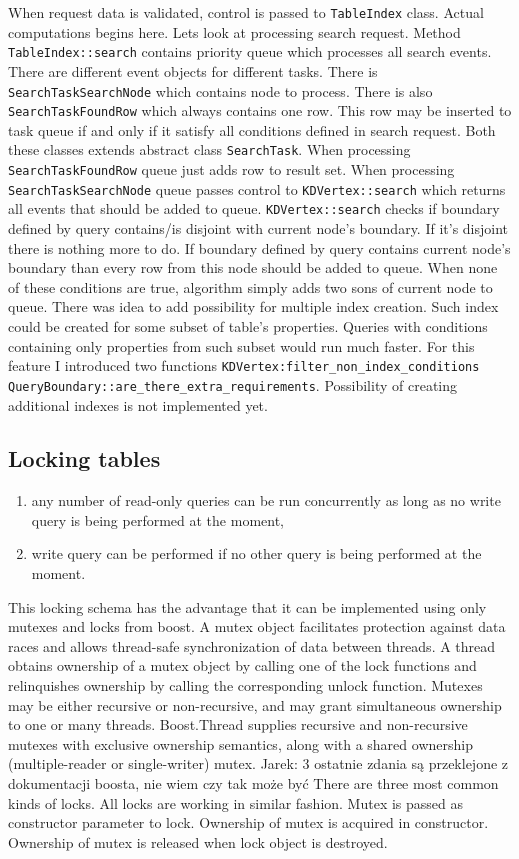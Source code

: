 \documentclass[10pt,a4paper]{article}
\newcommand{\jarek}[1]{\noindent\colorbox{myYellow}{Jarek: #1}}
\begin{document}
When request data is validated, control is passed to \verb|TableIndex| class. Actual computations begins here. Lets look at processing search request. Method \verb|TableIndex::search| contains priority queue which processes all search events. There are different event objects for different tasks. There is \verb|SearchTaskSearchNode| which contains node to process. There is also \verb|SearchTaskFoundRow| which always contains one row. This row may be inserted to task queue if and only if it satisfy all conditions defined in search request. Both these classes extends abstract class \verb|SearchTask|. When processing \verb|SearchTaskFoundRow| queue just adds row to result set. When processing \verb|SearchTaskSearchNode| queue passes control to \verb|KDVertex::search| which returns all events that should be added to queue. \verb|KDVertex::search| checks if boundary defined by query contains/is disjoint with current node's boundary. If it's disjoint there is nothing more to do. If boundary defined by query contains current node's boundary than every row from this node should be added to queue. When none of these conditions are true, algorithm simply adds two sons of current node to queue. There was idea to add possibility for multiple index creation. Such index could be created for some subset of table's properties. Queries with conditions containing only properties from such subset would run much faster. For this feature I introduced two functions \verb|KDVertex:filter_non_index_conditions| \verb|QueryBoundary::are_there_extra_requirements|. Possibility of creating additional indexes is not implemented yet.  

\subsection{Locking tables}
\begin{enumerate}
\item any number of read-only queries can be run concurrently as long as no write query is being performed at the moment,
\item write query can be performed if no other query is being performed at the moment.
\end{enumerate}

This locking schema has the advantage that it can be implemented using only mutexes and locks from boost. A mutex object facilitates protection against data races and allows thread-safe synchronization of data between threads. A thread obtains ownership of a mutex object by calling one of the lock functions and relinquishes ownership by calling the corresponding unlock function. Mutexes may be either recursive or non-recursive, and may grant simultaneous ownership to one or many threads. Boost.Thread supplies recursive and non-recursive mutexes with exclusive ownership semantics, along with a shared ownership (multiple-reader or single-writer) mutex. \jarek{3 ostatnie zdania są przeklejone z dokumentacji boosta, nie wiem czy tak może być}
There are three most common kinds of locks. All locks are working in similar fashion. Mutex is passed as constructor parameter to lock. Ownership of mutex is acquired in constructor. Ownership of mutex is released when lock object is destroyed.  
\end{document}
